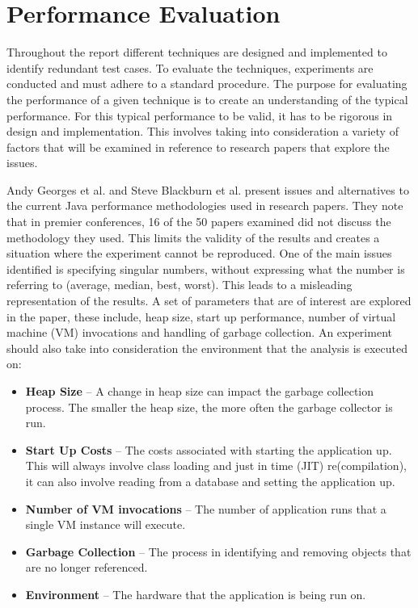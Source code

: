 \documentclass[11pt
              , a4paper
              , twoside
              , openright
              ]{report}
\begin{document}
\section{Performance Evaluation}
\label{performanceEvalBG}
Throughout the report different techniques are designed and implemented to identify redundant test cases. To evaluate the techniques, experiments are conducted and must adhere to a standard procedure. The purpose for evaluating the performance of a given technique is to create an understanding of the typical performance. For this typical performance to be valid, it has to be rigorous in design and implementation. This involves taking into consideration a variety of factors that will be examined in reference to research papers that explore the issues.

Andy Georges et al. \cite{georges2007statistically} and Steve Blackburn et al. \cite{blackburn2008wake} present issues and alternatives to the current Java performance methodologies used in research papers. They note that in premier conferences, 16 of the 50 papers examined did not discuss the methodology they used. This limits the validity of the results and creates a situation where the experiment cannot be reproduced. One of the main issues identified is specifying singular numbers, without expressing what the number is referring to (average, median, best, worst). This leads to a misleading representation of the results. A set of parameters that are of interest are explored in the paper, these include, heap size, start up performance, number of virtual machine (VM) invocations and handling of garbage collection. An experiment should also take into consideration the environment that the analysis is executed on:
\begin{itemize}
\item \textbf{Heap Size} -- A change in heap size can impact the garbage collection process. The smaller the heap size, the more often the garbage collector is run.
\item \textbf{Start Up Costs}  -- The costs associated with starting the application up. This will always involve class loading and just in time (JIT) re(compilation), it can also involve reading from a database and setting the application up.
\item \textbf{Number of VM invocations} -- The number of application runs that a single VM instance will execute.
\item \textbf{Garbage Collection} -- The process in identifying and removing objects that are no longer referenced.
\item \textbf{Environment} -- The hardware that the application is being run on.
\end{itemize}
\end{document}
